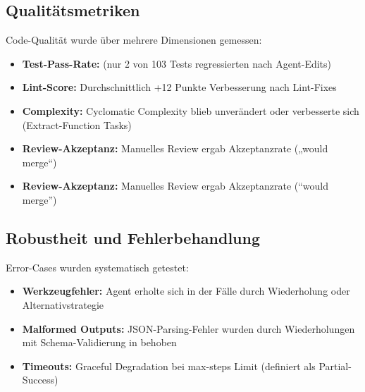 \subsection{Qualitätsmetriken}


Code-Qualität wurde über mehrere Dimensionen gemessen:

\begin{sloppypar}
\begin{itemize}
  \item \textbf{Test-Pass-Rate:}  (nur 2 von 103 Tests regressierten nach Agent-Edits)
  \item \textbf{Lint-Score:} Durchschnittlich +12 Punkte Verbesserung nach Lint-Fixes
  \item \textbf{Complexity:} Cyclomatic Complexity blieb unverändert oder verbesserte sich (Extract-Function Tasks)
  \item \textbf{Review-Akzeptanz:} Manuelles Review ergab  Akzeptanzrate („would merge“)
  \item \textbf{Review-Akzeptanz:} Manuelles Review ergab  Akzeptanzrate (\enquote{would merge})
\end{itemize}
\end{sloppypar}

\subsection{Robustheit und Fehlerbehandlung}

Error-Cases wurden systematisch getestet:

\begin{sloppypar}
\begin{itemize}
  \item \textbf{Werkzeugfehler:} Agent erholte sich in  der Fälle durch Wiederholung oder Alternativstrategie
  \item \textbf{Malformed Outputs:} JSON-Parsing-Fehler wurden durch Wiederholungen mit Schema-Validierung in  behoben
  \item \textbf{Timeouts:} Graceful Degradation bei max-steps Limit (definiert als  Partial-Success)
\end{itemize}
\end{sloppypar}

